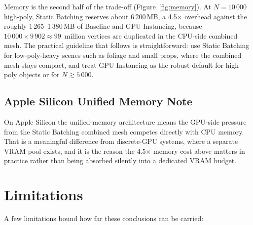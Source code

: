 \documentclass[11pt,a4paper]{article}
\begin{document}
\begin{table}[H]
  \centering
  \caption{Static Batching theoretical vs.\ measured batch count.
    $\Delta =$ measured $-$ theoretical.}
  \label{tab:staticbatch}
  
\end{table}

Memory is the second half of the trade-off (Figure~\ref{fig:memory}). At $N=10\,000$
high-poly, Static Batching reserves about 6\,200\,MB, a 4.5$\times$ overhead against the
roughly 1\,265--1\,380\,MB of Baseline and GPU Instancing, because
$10\,000 \times 9\,902 \approx 99$~million vertices are duplicated in the CPU-side
combined mesh. The practical guideline that follows is straightforward: use Static
Batching for low-poly-heavy scenes such as foliage and small props, where the combined
mesh stays compact, and treat GPU Instancing as the robust default for high-poly
objects or for $N\gtrsim 5\,000$.

\subsection{Apple Silicon Unified Memory Note}

On Apple Silicon the unified-memory architecture means the GPU-side pressure from the
Static Batching combined mesh competes directly with CPU memory. That is a meaningful
difference from discrete-GPU systems, where a separate VRAM pool exists, and it is the
reason the 4.5$\times$ memory cost above matters in practice rather than being absorbed
silently into a dedicated VRAM budget.

\section{Limitations}
\label{sec:limitations}

A few limitations bound how far these conclusions can be carried:
\end{document}
